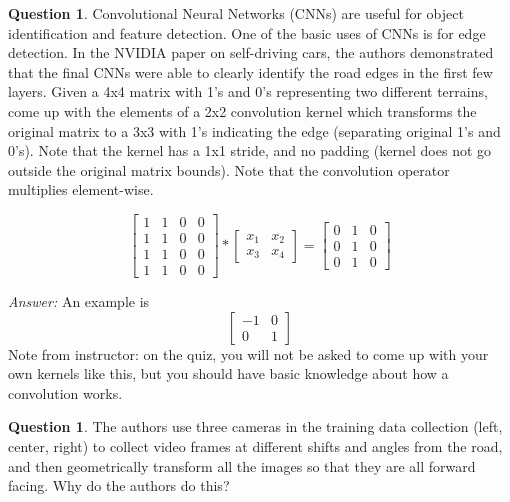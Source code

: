 \documentclass{article}
\theoremstyle{definition}
\newtheorem{question}[thm]{Question}
\newenvironment{answer}{\noindent\textit{Answer:}}{}
\begin{document}
\begin{question}
Convolutional Neural Networks (CNNs) are useful for object identification and feature detection. One of the basic uses of CNNs is for edge detection. In the NVIDIA paper on self-driving cars, the authors demonstrated that the final CNNs were able to clearly identify the road edges in the first few layers. Given a 4x4 matrix with 1’s and 0’s representing two different terrains, come up with the elements of a 2x2 convolution kernel which transforms the original matrix to a 3x3 with 1’s indicating the edge (separating original 1’s and 0’s). Note that the kernel has a 1x1 stride, and no padding (kernel does not go outside the original matrix bounds). Note that the convolution operator multiplies element-wise.

\begin{equation}
    \begin{bmatrix}
        1 & 1 & 0 & 0 \\
        1 & 1 & 0 & 0 \\
        1 & 1 & 0 & 0 \\
        1 & 1 & 0 & 0
    \end{bmatrix} * 
    \begin{bmatrix}
        x_1 & x_2 \\
        x_3 & x_4
    \end{bmatrix} = 
    \begin{bmatrix}
        0 & 1 & 0 \\
        0 & 1 & 0 \\
        0 & 1 & 0
    \end{bmatrix}
\end{equation}
\end{question}

\begin{answer}
    An example is
    \begin{equation}
        \begin{bmatrix}
            -1 & 0 \\
            0 & 1
        \end{bmatrix}
    \end{equation}
    Note from instructor: on the quiz, you will not be asked to come up with your own kernels like this, but you should have basic knowledge about how a convolution works.
\end{answer}

\begin{question}
The authors use three cameras in the training data collection (left, center, right) to collect video frames at different shifts and angles from the road, and then geometrically transform all the images so that they are all forward facing. Why do the authors do this?
\end{question}
\end{document}
